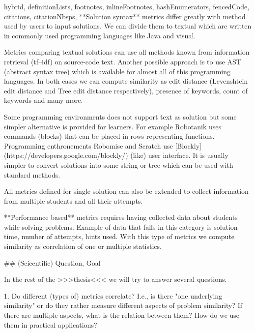 \documentclass[
  digital, %
  table,   %
  lof,     %
  lot,     %
]{fithesis3}
\begin{document}
\begin{markdown*}{%
  hybrid,
  definitionLists,
  footnotes,
  inlineFootnotes,
  hashEnumerators,
  fencedCode,
  citations,
  citationNbsps,
}
**Solution syntax** metrics differ greatly with method used by users to input solutions. We can divide them to textual which are written in commonly used programming languages like Java and visual.

Metrics comparing textual solutions can use all methods known from information retrieval (tf–idf) on source-code text. Another possible approach is to use AST (abstract syntax tree) which is available for almost all of this programming languages. In both cases we can compute similarity as edit distance (Levenshtein edit distance and Tree edit distance respectively), presence of keywords, count of keywords and many more.


Some programming environments does not support text as solution but some simpler alternative is provided for learners. For example Robotanik uses commands (blocks) that can be placed in rows representing functions. Programming enthronements Robomise and Scratch use [Blockly](https://developers.google.com/blockly/) (like) user interface.
It is usually simpler to convert solutions into some string or tree which can be used with standard methods.

All metrics defined for single solution can also be extended to collect information from multiple students and all their attempts.


**Performance based** metrics requires having collected data about students while solving problems. Example of data that falls in this category is solution time, number of attempts, hints used. With this type of metrics we compute similarity as correlation of one or multiple statistics.

## (Scicentific) Question, Goal

In the rest of the >>>thesis<<< we will try to answer several questions.

1. Do different (types of) metrics correlate? I.e., is there "one underlying similarity" or do they rather measure different aspects of problem similarity? If there are multiple aspects, what is the relation between them? How do we use them in practical applications?


\end{markdown*}
\end{document}

